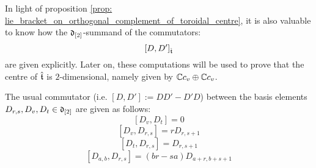         In light of proposition \ref{prop: lie_bracket_on_orthogonal_complement_of_toroidal_centre}, it is also valuable to know how the $\mathfrak{d}_{[2]}$-summand of the commutators:
            $$[D, D']_{\hat{\mathfrak{t}}}$$
        are given explicitly. Later on, these computations will be used to prove that the centre of $\hat{\mathfrak{t}}$ is $2$-dimensional, namely given by $\mathbb{C} c_v \oplus \mathbb{C} c_v$.
        \begin{lemma} \label{lemma: explicit_commutators_between_basis_elements_of_toroidal_central_orthogonal_complement}
            The usual commutator (i.e. $[D, D'] := DD' - D'D$) between the basis elements $D_{r, s}, D_v, D_t \in \mathfrak{d}_{[2]}$ are given as follows:
                $$[D_v, D_t] = 0$$
                $$[D_v, D_{r, s}] = r D_{r, s + 1}$$
                $$[D_t, D_{r, s}] = D_{r, s + 1}$$
                $$[D_{a, b}, D_{r, s}] = (br - sa) D_{a + r, b + s + 1}$$
        \end{lemma}
